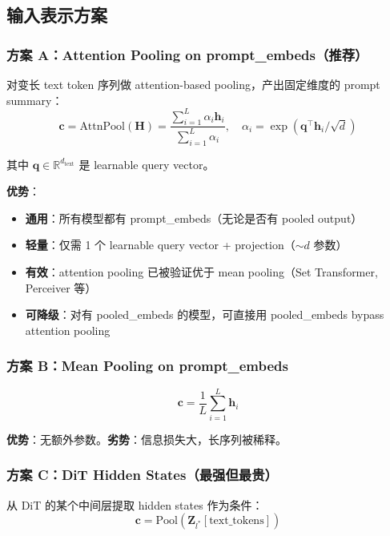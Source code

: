 \documentclass[11pt,a4paper]{article}
\newcommand{\R}{\mathbb{R}}
\theoremstyle{definition}
\begin{document}
\subsection{输入表示方案}

\subsubsection{方案 A：Attention Pooling on prompt\_embeds（推荐）}

对变长 text token 序列做 attention-based pooling，产出固定维度的 prompt summary：
\begin{equation}
\mathbf{c} = \text{AttnPool}(\mathbf{H}) = \frac{\sum_{i=1}^L \alpha_i \mathbf{h}_i}{\sum_{i=1}^L \alpha_i}, \quad
\alpha_i = \exp(\mathbf{q}^\top \mathbf{h}_i / \sqrt{d})
\end{equation}

其中 $\mathbf{q} \in \R^{d_\text{text}}$ 是 learnable query vector。

\textbf{优势}：
\begin{itemize}
    \item \textbf{通用}：所有模型都有 prompt\_embeds（无论是否有 pooled output）
    \item \textbf{轻量}：仅需 1 个 learnable query vector + projection（$\sim d$ 参数）
    \item \textbf{有效}：attention pooling 已被验证优于 mean pooling（Set Transformer, Perceiver 等）
    \item \textbf{可降级}：对有 pooled\_embeds 的模型，可直接用 pooled\_embeds bypass attention pooling
\end{itemize}

\subsubsection{方案 B：Mean Pooling on prompt\_embeds}

\begin{equation}
\mathbf{c} = \frac{1}{L} \sum_{i=1}^L \mathbf{h}_i
\end{equation}

\textbf{优势}：无额外参数。\textbf{劣势}：信息损失大，长序列被稀释。

\subsubsection{方案 C：DiT Hidden States（最强但最贵）}

从 DiT 的某个中间层提取 hidden states 作为条件：
\begin{equation}
\mathbf{c} = \text{Pool}(\mathbf{Z}_{l^*}[\text{text\_tokens}])
\end{equation}
\end{document}
